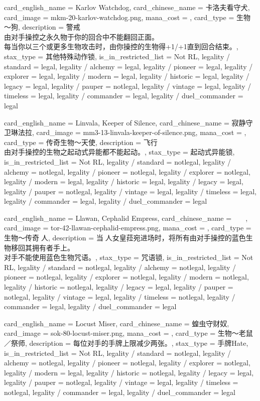 \documentclass[lang = cn, color = black, 10pt]{AllThatStax}
\begin{document}
\card
{
	card_english_name = {Karlov Watchdog},
	card_chinese_name = {卡洛夫看守犬},
	card_image = mkm-20-karlov-watchdog.png,
	mana_cost = ,
	card_type = 生物～狗,
	description = {警戒\\
由对手操控之永久物于你的回合中不能翻回正面。\\
每当你以三个或更多生物攻击时，由你操控的生物得+1/+1直到回合结束。},
	stax_type = 其他特殊动作锁,
	is_in_restricted_list = Not RL,
	legality / standard = legal,
	legality / alchemy = legal,
	legality / pioneer = legal,
	legality / explorer = legal,
	legality / modern = legal,
	legality / historic = legal,
	legality / legacy = legal,
	legality / pauper = notlegal,
	legality / vintage = legal,
	legality / timeless = legal,
	legality / commander = legal,
	legality / duel_commander = legal
}

\card
{
	card_english_name = {Linvala, Keeper of Silence},
	card_chinese_name = {寂静守卫琳法拉},
	card_image = mm3-13-linvala-keeper-of-silence.png,
	mana_cost = ,
	card_type = 传奇生物～天使,
	description = {飞行\\
由对手操控的生物之起动式异能都不能起动。},
	stax_type = 起动式异能锁,
	is_in_restricted_list = Not RL,
	legality / standard = notlegal,
	legality / alchemy = notlegal,
	legality / pioneer = notlegal,
	legality / explorer = notlegal,
	legality / modern = legal,
	legality / historic = legal,
	legality / legacy = legal,
	legality / pauper = notlegal,
	legality / vintage = legal,
	legality / timeless = legal,
	legality / commander = legal,
	legality / duel_commander = legal
}

\card
{
	card_english_name = {Llawan, Cephalid Empress},
	card_chinese_name = {𫠒人女皇菈宛},
	card_image = tor-42-llawan-cephalid-empress.png,
	mana_cost = ,
	card_type = 生物～传奇𫠒人,
	description = {当𫠒人女皇菈宛进场时，将所有由对手操控的蓝色生物移回其拥有者手上。\\
对手不能使用蓝色生物咒语。},
	stax_type = 咒语锁,
	is_in_restricted_list = Not RL,
	legality / standard = notlegal,
	legality / alchemy = notlegal,
	legality / pioneer = notlegal,
	legality / explorer = notlegal,
	legality / modern = notlegal,
	legality / historic = notlegal,
	legality / legacy = legal,
	legality / pauper = notlegal,
	legality / vintage = legal,
	legality / timeless = notlegal,
	legality / commander = legal,
	legality / duel_commander = legal
}

\card
{
	card_english_name = {Locust Miser},
	card_chinese_name = {蝗虫守财奴},
	card_image = sok-80-locust-miser.png,
	mana_cost = ,
	card_type = 生物～老鼠／祭师,
	description = {每位对手的手牌上限减少两张。},
	stax_type = 手牌Hate,
	is_in_restricted_list = Not RL,
	legality / standard = notlegal,
	legality / alchemy = notlegal,
	legality / pioneer = notlegal,
	legality / explorer = notlegal,
	legality / modern = legal,
	legality / historic = notlegal,
	legality / legacy = legal,
	legality / pauper = notlegal,
	legality / vintage = legal,
	legality / timeless = notlegal,
	legality / commander = legal,
	legality / duel_commander = legal
}
\end{document}
